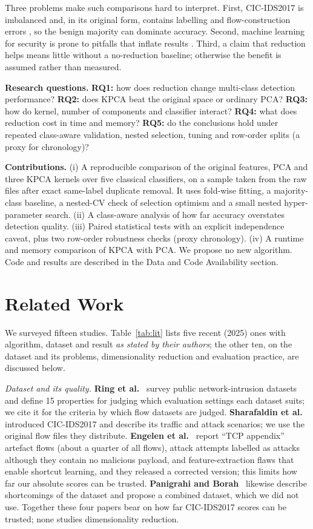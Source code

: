 \documentclass[runningheads]{llncs}
\begin{document}
Three problems make such comparisons hard to interpret. First, CIC-IDS2017 is imbalanced and, in its original form, contains labelling and flow-construction errors \cite{engelen2021,panigrahi2018}, so the benign majority can dominate accuracy. Second, machine learning for security is prone to pitfalls that inflate results \cite{arp2022}. Third, a claim that reduction helps means little without a no-reduction baseline; otherwise the benefit is assumed rather than measured.

\textbf{Research questions.} \textbf{RQ1:} how does reduction change multi-class detection performance? \textbf{RQ2:} does KPCA beat the original space or ordinary PCA? \textbf{RQ3:} how do kernel, number of components and classifier interact? \textbf{RQ4:} what does reduction cost in time and memory? \textbf{RQ5:} do the conclusions hold under repeated class-aware validation, nested selection, tuning and row-order splits (a proxy for chronology)?

\textbf{Contributions.} (i) A reproducible comparison of the original features, PCA and three KPCA kernels over five classical classifiers, on a sample taken from the raw files after exact same-label duplicate removal. It uses fold-wise fitting, a majority-class baseline, a nested-CV check of selection optimism and a small nested hyper-parameter search. (ii) A class-aware analysis of how far accuracy overstates detection quality. (iii) Paired statistical tests with an explicit independence caveat, plus two row-order robustness checks (proxy chronology). (iv) A runtime and memory comparison of KPCA with PCA. We propose no new algorithm. Code and results are described in the Data and Code Availability section.

\section{Related Work}
We surveyed fifteen studies. Table~\ref{tab:lit} lists five recent (2025) ones with algorithm, dataset and result \emph{as stated by their authors}; the other ten, on the dataset and its problems, dimensionality reduction and evaluation practice, are discussed below.


\textit{Dataset and its quality.} \textbf{Ring et al.}~\cite{ring2019} survey public network-intrusion datasets and define 15 properties for judging which evaluation settings each dataset suits; we cite it for the criteria by which flow datasets are judged. \textbf{Sharafaldin et al.}~\cite{sharafaldin2018} introduced CIC-IDS2017 and describe its traffic and attack scenarios; we use the original flow files they distribute. \textbf{Engelen et al.}~\cite{engelen2021} report ``TCP appendix'' artefact flows (about a quarter of all flows), attack attempts labelled as attacks although they contain no malicious payload, and feature-extraction flaws that enable shortcut learning, and they released a corrected version; this limits how far our absolute scores can be trusted. \textbf{Panigrahi and Borah}~\cite{panigrahi2018} likewise describe shortcomings of the dataset and propose a combined dataset, which we did not use. Together these four papers bear on how far CIC-IDS2017 scores can be trusted; none studies dimensionality reduction.
\end{document}

